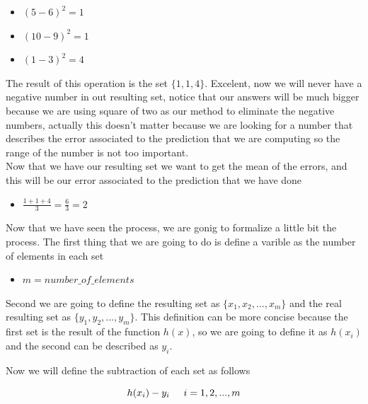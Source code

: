 \documentclass[12pt,journal]{IEEEtran}
\begin{document}
    \begin{itemize}
        \item $(5-6)^2 = 1$
        \item $(10-9)^2 = 1$
        \item $(1-3)^2 = 4$\\
    \end{itemize}

    The result of this operation is the set $\{1,1,4\}$. Excelent, now we will
    never have a negative number in out resulting set, notice that our
    answers will be much bigger because we are using square of two as our
    method to eliminate the negative numbers, actually this doesn't matter
    because we are looking for a number that describes the error associated to
    the prediction that we are computing so the range of the number is not too
    important.\\

    Now that we have our resulting set we want to get the mean of the errors,
    and this will be our error associated to the prediction that we have done\\

    \begin{itemize}
        \item $\frac{1+1+4}{3} = \frac{6}{3} = 2$ \\
    \end{itemize}

    Now that we have seen the process, we are gonig to formalize a little bit
    the process. The first thing that we are going to do is define a varible as
    the number of elements in each set \\

    \begin{itemize}
        \item $m = number\_of\_elements$ \\
    \end{itemize}

    Second we are going to define the resulting set as $\{x_1,x_2, ... , x_m\}$
    and the real resulting set as $\{y_1,y_2, ... , y_m\}$. This definition can
    be more concise because the first set is the result of the function $h(x)$,
    so we are going to define it as $h(x_i)$ and the second can be described as
    $y_i$.

    Now we will define the subtraction of each set as follows

    \begin{equation}
        h(x_i) - y_i \hspace{0.5cm} i=1, 2, ..., m
    \end{equation}
\end{document}
